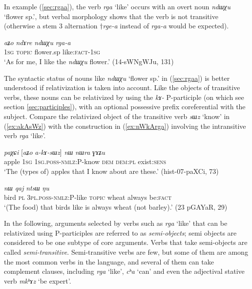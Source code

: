 \documentclass[oneside,a4paper,11pt]{article}
\newcommand{\ipa}[1]{\textit{\phon#1}}
\newcommand{\jpg}[2]{\ipa{#1} `#2'}
\newcommand{\refb}[1]{(\ref{#1})}
\begin{document}
In example \refb{sec:rgaa}, the verb \jpg{rga}{like} occurs with an overt noun \jpg{ndɯχu}{flower sp.}, but verbal morphology shows that the verb is not transitive (otherwise a stem 3 alternation $\dagger$\ipa{rge-a} instead of \ipa{rga-a} would be expected). 

\begin{exe}
\ex \label{sec:rgaa}
\gll \ipa{aʑo} 	\ipa{ndɤre} 	\ipa{ndɯχu} 	\ipa{rga-a} \\ %
\textsc{1sg} \textsc{topic} flower.sp like:\textsc{fact}-\textsc{1sg}  \\ %
\glt `As for me, I like the \ipa{ndɯχu} flower.' (14-sWNgWJu, 131)
\end{exe}

The syntactic status of nouns like \jpg{ndɯχu}{flower sp.} in \refb{sec:rgaa} is better understood if relativization is taken into account. Like the objects of transitive verbs, these nouns can be relativized by using the \ipa{kɤ-} P-participle (on which see section \ref{sec:participles}), with an optional possessive prefix coreferential with the subject. Compare the relativized object  of the transitive verb \jpg{sɯz}{know} in \refb{ex:akAsWz}  with the construction in \refb{ex:nWkArga}  involving the intransitive verb \jpg{rga}{like}.

\begin{exe}
   \ex   \label{ex:akAsWz}  
\gll 
\ipa{paχɕi} 	[\ipa{aʑo} 	\ipa{a-kɤ-sɯz}] 	\ipa{nɯ} 	\ipa{nɯra} 	\ipa{ɣɤʑu}  \\
apple \textsc{1sg} \textsc{1sg.poss-nmlz:P}-know \textsc{dem} \textsc{dem:pl} exist:\textsc{sens} \\
\glt `The (types of) apples that I know about are these.' (hist-07-paXCi, 73)
   \end{exe} 
   
\begin{exe}
   \ex   \label{ex:nWkArga}  
\gll [\ipa{pɣa}  	\ipa{ra}  	\ipa{nɯ-kɤ-rga}]  	\ipa{nɯ}  	\ipa{qaj}  	\ipa{ntsɯ}  	\ipa{ŋu}  \\
bird \textsc{pl} \textsc{3pl.poss-nmlz:P}-like \textsc{topic} wheat always be:\textsc{fact} \\
\glt `(The food) that birds like is always wheat (not barley).' (23 pGAYaR, 29)
   \end{exe} 

In the following, arguments selected by verbs such as \jpg{rga}{like} that can be relativized using P-participles are referred to as \textit{semi-objects}; semi objects are considered to be one subtype of core arguments. Verbs that take semi-objects are called \textit{semi-transitive}. Semi-transitive verbs are few, but some of them are among the most common verbs in the language, and several of them can take complement clauses, including \jpg{rga}{like}, \jpg{cʰa}{can}  and even the adjectival stative verb \jpg{mkʰɤz}{be expert}.
\end{document}
